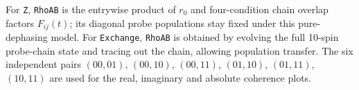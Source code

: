 \documentclass[10pt,a4paper]{article}
\newcommand{\code}[1]{\texttt{#1}}
\begin{document}
For \code{Z}, \code{RhoAB} is the entrywise product of $r_0$ and four-condition chain overlap factors $F_{ij}(t)$; its diagonal probe populations stay fixed under this pure-dephasing model. For \code{Exchange}, \code{RhoAB} is obtained by evolving the full 10-spin probe-chain state and tracing out the chain, allowing population transfer. The six independent pairs $(00,01)$, $(00,10)$, $(00,11)$, $(01,10)$, $(01,11)$, $(10,11)$ are used for the real, imaginary and absolute coherence plots. 
\end{document}
